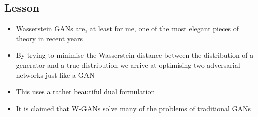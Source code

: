 \begin{slide}
\section{Lesson}

\begin{PauseHighLight}
  \begin{itemize}
  \item Wasserstein GANs are, at least for me, one of the most elegant
    pieces of theory in recent years\pause
  \item By trying to minimise the Wasserstein distance between the
    distribution of a generator and a true distribution we arrive at
    optimising two adversarial networks just like a GAN\pause
  \item This uses a rather beautiful dual formulation\pause
  \item It is claimed that W-GANs solve many of the problems of
    traditional GANs\pause
  \end{itemize}
\end{PauseHighLight}

\end{slide}





